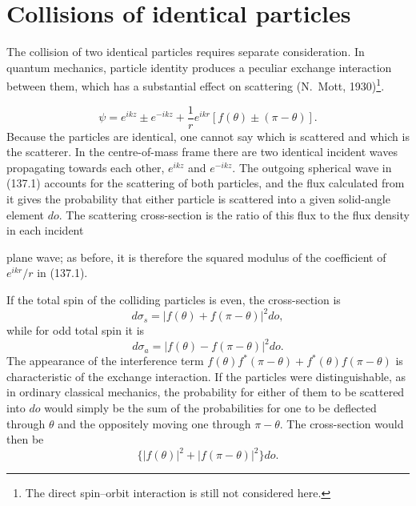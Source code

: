 \section{Collisions of identical particles}

The collision of two identical particles requires separate consideration. In quantum mechanics, particle identity produces a peculiar exchange interaction between them, which has a substantial effect on scattering (N.~Mott, 1930)\footnote{The direct spin--orbit interaction is still not considered here.}.


\begin{equation}
 \psi=e^{ikz}\pm e^{-ikz}+\frac1r e^{ikr}[f(\theta)\pm(\pi-\theta)].
 \tag{137.1}
\end{equation}
Because the particles are identical, one cannot say which is scattered and which is the scatterer. In the centre-of-mass frame there are two identical incident waves propagating towards each other, $e^{ikz}$ and $e^{-ikz}$. The outgoing spherical wave in (137.1) accounts for the scattering of both particles, and the flux calculated from it gives the probability that either particle is scattered into a given solid-angle element $d o$. The scattering cross-section is the ratio of this flux to the flux density in each incident

plane wave; as before, it is therefore the squared modulus of the coefficient of $e^{ikr}/r$ in (137.1).

If the total spin of the colliding particles is even, the cross-section is
\begin{equation}
 d\sigma_s=|f(\theta)+f(\pi-\theta)|^2d o,
 \tag{137.2}
\end{equation}
while for odd total spin it is
\begin{equation}
 d\sigma_a=|f(\theta)-f(\pi-\theta)|^2d o.
 \tag{137.3}
\end{equation}
The appearance of the interference term $f(\theta)f^*(\pi-\theta)+f^*(\theta)f(\pi-\theta)$ is characteristic of the exchange interaction. If the particles were distinguishable, as in ordinary classical mechanics, the probability for either of them to be scattered into $d o$ would simply be the sum of the probabilities for one to be deflected through $\theta$ and the oppositely moving one through $\pi-\theta$. The cross-section would then be
\[
 \{|f(\theta)|^2+|f(\pi-\theta)|^2\}d o.
\]

